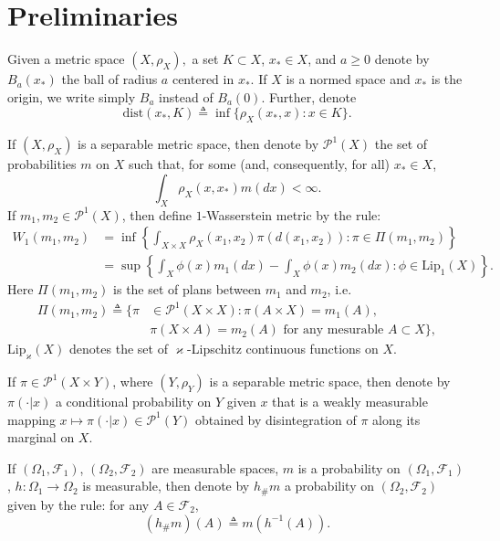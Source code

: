 \documentclass[12pt]{article}
\begin{document}
\section{Preliminaries}\label{sec:preliminaries}


Given  a metric space $(X,\rho_X),$ a set $K\subset X$, $x_*\in X$, and $a\geq 0$ denote by $B_a(x_*)$ the ball of radius $a$ centered in $x_*$. If $X$ is a normed space and $x_*$ is the origin, we  write simply $B_a$ instead of $B_a(0)$. Further, denote
$$\mathrm{dist}(x_*,K)\triangleq \inf\{\rho_X(x_*,x):x\in K\}. $$

If $(X,\rho_X)$ is a separable metric space, then denote by $\mathcal{P}^1(X)$ the set of probabilities $m$ on $X$ such that, for some (and, consequently, for all) $x_*\in X$, 
$$\int_X \rho_X(x,x_*)m(dx)<\infty. $$ If $m_1,m_2\in\mathcal{P}^1(X)$, then define $1$-Wasserstein metric by the rule:
\begin{equation}\label{notion:wasser}
\begin{split}
W_1(m_1,m_2)&=\inf\left\{\int_{X\times X}\rho_X(x_1,x_2)\pi(d(x_1,x_2)):\pi\in\Pi(m_1,m_2)\right\}\\&=
\sup\left\{\int_X\phi(x)m_1(dx)-\int_X\phi(x)m_2(dx):\phi\in\mathrm{Lip}_1(X)\right\}.
\end{split}
\end{equation} 
Here $\Pi(m_1,m_2)$ is the set of plans between $m_1$ and $m_2$, i.e. \begin{equation*}\begin{split}\Pi(m_1,m_2)\triangleq \{\pi&\in\mathcal{P}^1(X\times X): \pi(A\times X)=m_1(A),\\ &\pi( X\times A)=m_2(A)\mbox{ for any mesurable } A\subset X\},\end{split} \end{equation*}
$\mathrm{Lip}_\varkappa(X)$ denotes the set of $\varkappa$-Lipschitz continuous functions on $X$. 



If $\pi\in \mathcal{P}^1(X\times Y)$, where $(Y,\rho_Y)$ is a separable metric space, then denote by $\pi(\cdot|x)$ a conditional probability on $Y$ given $x$ that is a weakly measurable mapping $x\mapsto\pi(\cdot|x)\in \mathcal{P}^1(Y)$ obtained by disintegration of $\pi$ along its marginal on $X$.

If $(\Omega_1,\mathcal{F}_1)$, $(\Omega_2,\mathcal{F}_2)$ are measurable spaces, $m$ is a probability on $(\Omega_1,\mathcal{F}_1)$, $h:\Omega_1\rightarrow\Omega_2$ is measurable, then denote by $h_\#m$ a probability on $(\Omega_2,\mathcal{F}_2)$ given by the rule: for any $A\in\mathcal{F}_2$,
$$(h_\#m)(A)\triangleq m(h^{-1}(A)). $$
\end{document}
